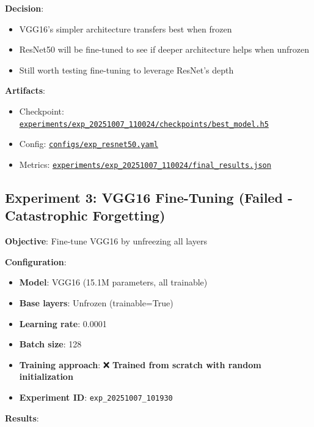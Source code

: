 \documentclass[
  letterpaper,
  DIV=11,
  numbers=noendperiod]{scrartcl}
\providecommand{\tightlist}{%
  \setlength{\itemsep}{0pt}\setlength{\parskip}{0pt}}
\begin{document}
\textbf{Decision}:

\begin{itemize}
\tightlist
\item
  VGG16's simpler architecture transfers best when frozen
\item
  ResNet50 will be fine-tuned to see if deeper architecture helps when
  unfrozen
\item
  Still worth testing fine-tuning to leverage ResNet's depth
\end{itemize}

\textbf{Artifacts}:

\begin{itemize}
\tightlist
\item
  Checkpoint:
  \href{../experiments/exp_20251007_110024/checkpoints/best_model.h5}{\texttt{experiments/exp\_20251007\_110024/checkpoints/best\_model.h5}}
\item
  Config:
  \href{../configs/exp_resnet50.yaml}{\texttt{configs/exp\_resnet50.yaml}}
\item
  Metrics:
  \href{../experiments/exp_20251007_110024/final_results.json}{\texttt{experiments/exp\_20251007\_110024/final\_results.json}}
\end{itemize}

\subsection{Experiment 3: VGG16 Fine-Tuning (Failed - Catastrophic
Forgetting)}\label{experiment-3-vgg16-fine-tuning-failed---catastrophic-forgetting}

\textbf{Objective}: Fine-tune VGG16 by unfreezing all layers

\textbf{Configuration}:

\begin{itemize}
\tightlist
\item
  \textbf{Model}: VGG16 (15.1M parameters, all trainable)
\item
  \textbf{Base layers}: Unfrozen (trainable=True)
\item
  \textbf{Learning rate}: 0.0001
\item
  \textbf{Batch size}: 128
\item
  \textbf{Training approach}: ❌ \textbf{Trained from scratch with
  random initialization}
\item
  \textbf{Experiment ID}: \texttt{exp\_20251007\_101930}
\end{itemize}

\textbf{Results}:
\end{document}

